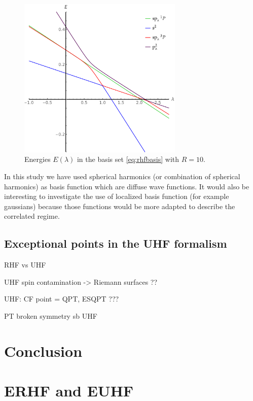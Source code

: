 \documentclass[11pt,a4paper]{article}
\begin{document}
\begin{figure}[h!]
    \centering
    \includegraphics[width=0.7\textwidth]{EMP_UHF_R10.pdf}
    \caption{\centering Energies $E(\lambda)$ in the basis set \eqref{eq:rhfbasis} with $R=10$.}
    \label{fig:UHFMiniBas}
\end{figure}

In this study we have used spherical harmonics (or combination of spherical harmonics) as basis function which are diffuse wave functions. It would also be interesting to investigate the use of localized basis function \cite{Seidl_2018} (for example gaussians) because those functions would be more adapted to describe the correlated regime. \\

\subsection{Exceptional points in the UHF formalism}\label{sec:uhfSing}

RHF vs UHF

UHF spin contamination -> Riemann surfaces ??

UHF: CF point = QPT, ESQPT ???

PT broken symmetry sb UHF

\section{Conclusion}

\newpage

\printbibliography

\newpage
\appendix

\section{ERHF and EUHF}
\end{document}
